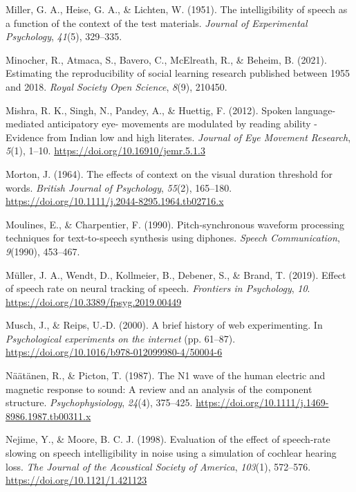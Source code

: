 \documentclass[a4paper, nobind]{templates/ociamthesis}
\newlength{\cslhangindent}
\newenvironment{CSLReferences}[2] %
 {%
  \setlength{\parindent}{0pt}
  \ifodd #1
  \let\oldpar\par
  \def\par{\hangindent=\cslhangindent\oldpar}
  \fi
  \setlength{\parskip}{1mm}
  \setlength{\baselineskip}{6mm}
 }%
 {}
\begin{document}
\begin{CSLReferences}{1}{0}
\leavevmode{}%
Miller, G. A., Heise, G. A., \& Lichten, W. (1951). {The intelligibility of speech as a function of the context of the test materials}. \emph{Journal of Experimental Psychology}, \emph{41}(5), 329--335.

\leavevmode{}%
Minocher, R., Atmaca, S., Bavero, C., McElreath, R., \& Beheim, B. (2021). Estimating the reproducibility of social learning research published between 1955 and 2018. \emph{Royal Society Open Science}, \emph{8}(9), 210450.

\leavevmode{}%
Mishra, R. K., Singh, N., Pandey, A., \& Huettig, F. (2012). {Spoken language-mediated anticipatory eye- movements are modulated by reading ability - Evidence from Indian low and high literates}. \emph{Journal of Eye Movement Research}, \emph{5}(1), 1--10. \url{https://doi.org/10.16910/jemr.5.1.3}

\leavevmode{}%
Morton, J. (1964). {The effects of context on the visual duration threshold for words}. \emph{British Journal of Psychology}, \emph{55}(2), 165--180. \url{https://doi.org/10.1111/j.2044-8295.1964.tb02716.x}

\leavevmode{}%
Moulines, E., \& Charpentier, F. (1990). {Pitch-synchronous waveform processing techniques for text-to-speech synthesis using diphones}. \emph{Speech Communication}, \emph{9}(1990), 453--467.

\leavevmode{}%
Müller, J. A., Wendt, D., Kollmeier, B., Debener, S., \& Brand, T. (2019). {Effect of speech rate on neural tracking of speech}. \emph{Frontiers in Psychology}, \emph{10}. \url{https://doi.org/10.3389/fpsyg.2019.00449}

\leavevmode{}%
Musch, J., \& Reips, U.-D. (2000). {A brief history of web experimenting}. In \emph{Psychological experiments on the internet} (pp. 61--87). \url{https://doi.org/10.1016/b978-012099980-4/50004-6}

\leavevmode{}%
Näätänen, R., \& Picton, T. (1987). {The N1 wave of the human electric and magnetic response to sound: A review and an analysis of the component structure}. \emph{Psychophysiology}, \emph{24}(4), 375--425. \url{https://doi.org/10.1111/j.1469-8986.1987.tb00311.x}

\leavevmode{}%
Nejime, Y., \& Moore, B. C. J. (1998). {Evaluation of the effect of speech-rate slowing on speech intelligibility in noise using a simulation of cochlear hearing loss}. \emph{The Journal of the Acoustical Society of America}, \emph{103}(1), 572--576. \url{https://doi.org/10.1121/1.421123}


\end{CSLReferences}
\end{document}
